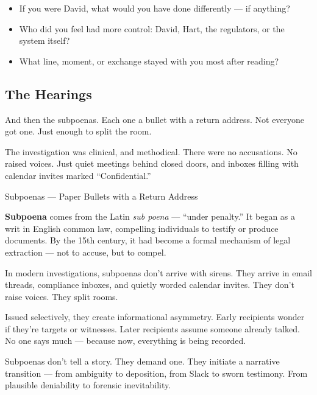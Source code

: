 \begin{itemize}
  \item If you were David, what would you have done differently — if anything?
  \item Who did you feel had more control: David, Hart, the regulators, or the system itself?
  \item What line, moment, or exchange stayed with you most after reading?
\end{itemize}








\subsection{The Hearings}


And then the subpoenas.  
Each one a bullet with a return address.  
Not everyone got one. Just enough to split the room.


The investigation was clinical, and methodical.  
There were no accusations. No raised voices.  
Just quiet meetings behind closed doors,  
and inboxes filling with calendar invites marked “Confidential.”

\medskip

\begin{HistoricalSidebar}{Subpoenas --- Paper Bullets with a Return Address}

  \textbf{Subpoena} comes from the Latin \textit{sub poena} — ``under penalty.'' It began as a writ in English 
  common law, compelling individuals to testify or produce documents. By the 15th century, it had become a 
  formal mechanism of legal extraction — not to accuse, but to compel.

  \medskip

  In modern investigations, subpoenas don’t arrive with sirens. They arrive in email threads, compliance inboxes, 
  and quietly worded calendar invites. They don’t raise voices. They split rooms.

  \medskip

  Issued selectively, they create informational asymmetry. Early recipients wonder if they’re targets or witnesses. 
  Later recipients assume someone already talked. No one says much — because now, everything is being recorded.

  \medskip

  Subpoenas don’t tell a story. They demand one. They initiate a narrative transition — from ambiguity to deposition, 
  from Slack to sworn testimony. From plausible deniability to forensic inevitability.
  
\end{HistoricalSidebar}

